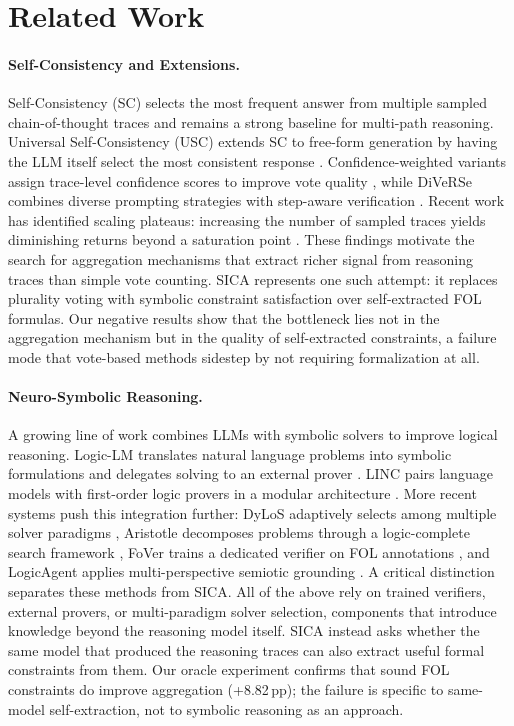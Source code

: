 \section{Related Work}
\label{sec:related-work}

\paragraph{Self-Consistency and Extensions.}
Self-Consistency (SC) selects the most frequent answer from multiple sampled chain-of-thought traces \citep{wang2023sc} and remains a strong baseline for multi-path reasoning. Universal Self-Consistency (USC) extends SC to free-form generation by having the LLM itself select the most consistent response \citep{chen2024usc}. Confidence-weighted variants assign trace-level confidence scores to improve vote quality \citep{taubenfeld2025cisc}, while DiVeRSe combines diverse prompting strategies with step-aware verification \citep{li2023diverse}. Recent work has identified scaling plateaus: increasing the number of sampled traces yields diminishing returns beyond a saturation point \citep{loo2025reevaluating}. These findings motivate the search for aggregation mechanisms that extract richer signal from reasoning traces than simple vote counting. SICA represents one such attempt: it replaces plurality voting with symbolic constraint satisfaction over self-extracted FOL formulas. Our negative results show that the bottleneck lies not in the aggregation mechanism but in the quality of self-extracted constraints, a failure mode that vote-based methods sidestep by not requiring formalization at all.

\paragraph{Neuro-Symbolic Reasoning.}
A growing line of work combines LLMs with symbolic solvers to improve logical reasoning. Logic-LM translates natural language problems into symbolic formulations and delegates solving to an external prover \citep{pan2023logiclm}. LINC pairs language models with first-order logic provers in a modular architecture \citep{olausson2023linc}. More recent systems push this integration further: DyLoS adaptively selects among multiple solver paradigms \citep{xu2026dylos}, Aristotle decomposes problems through a logic-complete search framework \citep{li2025aristotle}, FoVer trains a dedicated verifier on FOL annotations \citep{wang2025fover}, and LogicAgent applies multi-perspective semiotic grounding \citep{luo2025logicagent}. A critical distinction separates these methods from SICA. All of the above rely on trained verifiers, external provers, or multi-paradigm solver selection, components that introduce knowledge beyond the reasoning model itself. SICA instead asks whether the same model that produced the reasoning traces can also extract useful formal constraints from them. Our oracle experiment confirms that sound FOL constraints do improve aggregation (+8.82\,pp); the failure is specific to same-model self-extraction, not to symbolic reasoning as an approach.


